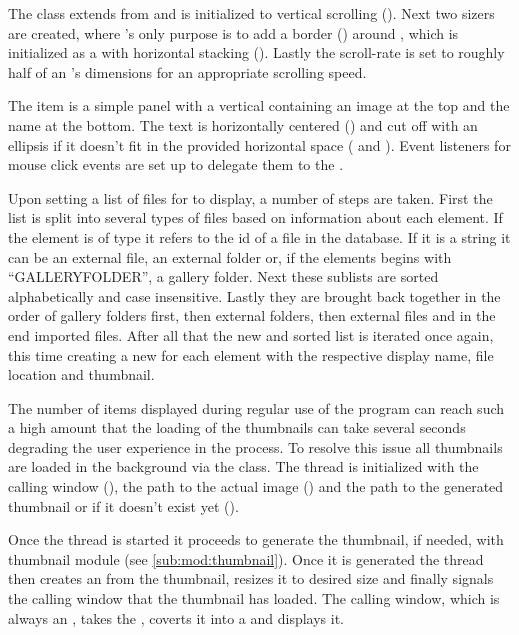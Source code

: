 \begin{sloppypar}
The  class extends from  and is
initialized to vertical scrolling (). Next
two sizers are created, where 's only purpose is to add a
border () around
, which is initialized as a  with horizontal
stacking (). Lastly the scroll-rate is set
to roughly half of an 's dimensions for an appropriate scrolling
speed.
\end{sloppypar}

\begin{sloppypar}
The item is a simple panel with a vertical 
\cite{wxBoxSizer} containing an image at the top and the name at the bottom. The
text is horizontally centered () and cut off
with an ellipsis if it doesn't fit in the provided horizontal space
( and
). Event listeners for mouse click
events are set up to delegate them to the .
\end{sloppypar}

Upon setting a list of files for  to display, a number of
steps are taken. First the list is split into several types of files based on
information about each element. If the element is of type  it
refers to the id of a file in the database. If it is a string it can be an
external file, an external folder or, if the elements begins with
``GALLERYFOLDER'', a gallery folder. Next these sublists are sorted
alphabetically and case insensitive. Lastly they are brought back together in
the order of gallery folders first, then external folders, then external files
and in the end imported files. After all that the new and sorted list is
iterated once again, this time creating a new  for each element
with the respective display name, file location and thumbnail.

The number of items displayed during regular use of the program can reach such
a high amount that the loading of the thumbnails can take several seconds
degrading the user experience in the process. To resolve this issue all
thumbnails are loaded in the background via the  class.
The thread is initialized with the calling window (), the
path to the actual image () and the path to the generated
thumbnail or  if it doesn't exist yet ().

Once the thread is started it proceeds to generate the thumbnail, if needed,
with thumbnail module (see \cref{sub:mod:thumbnail}). Once it is generated the
thread then creates an  from the thumbnail, resizes it to desired
size and finally signals the calling window that the thumbnail has loaded. The
calling window, which is always an , takes the 
\cite{wxImage}, coverts it into a  \cite{wxBitmap} and
displays it.
